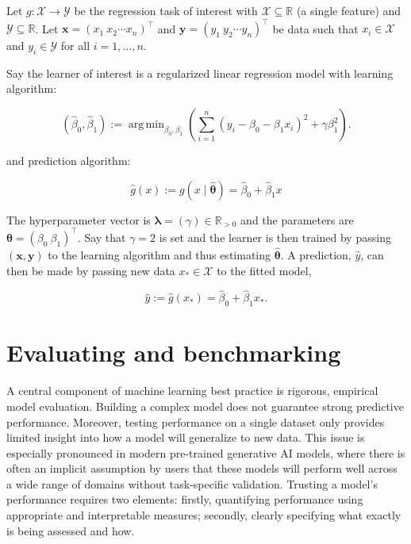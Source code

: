 \documentclass[
  letterpaper,
  krantz2]{style/krantz}
\begin{document}
\begin{tcolorbox}[enhanced jigsaw, toprule=.15mm, bottomtitle=1mm, opacityback=0, breakable, leftrule=.75mm, title={Box 1 (Ridge regression)}, toptitle=1mm, bottomrule=.15mm, colback=white, colframe=quarto-callout-note-color-frame, titlerule=0mm, opacitybacktitle=0.6, coltitle=black, rightrule=.15mm, left=2mm, colbacktitle=quarto-callout-note-color!10!white, arc=.35mm]

Let \(g : \mathcal{X}\rightarrow \mathcal{Y}\) be the
regression task of interest with
\(\mathcal{X}\subseteq \mathbb{R}\) (a single feature) and
\(\mathcal{Y}\subseteq \mathbb{R}\). Let
\(\boldsymbol{\mathbf{x}} = ({x}_1 \ {x}_2 \cdots {x}_{n})^\top\) and
\(\boldsymbol{\mathbf{y}} = ({y}_1 \ {y}_2 \cdots {y}_{n})^\top\) be
data such that \(x_i \in \mathcal{X}\) and \(y_i \in \mathcal{Y}\) for
all \(i = 1,\ldots,n\).

Say the learner of interest is a regularized linear regression
model with learning algorithm:

\[
(\hat{\beta}_0,\hat{\beta}_1):=\mathop{\mathrm{arg\,min}}_{\beta_0,\beta_1}\left(\sum_{i=1}^n\left(y_i-\beta_0 -\beta_1 x_i\right)^2+\gamma\beta_1^2\right).
\]

and prediction algorithm:

\[
\hat{g}(x):= g(x \mid \hat{\boldsymbol{\theta}}) = \hat{\beta}_0 + \hat{\beta}_1 x
\]

The hyperparameter vector is
\(\boldsymbol{\lambda}= (\gamma) \in \mathbb{R}_{>0}\) and the
parameters are \(\boldsymbol{\theta}= (\beta_0 \ \beta_1)^\top\). Say
that \(\gamma = 2\) is set and the learner is then trained by passing
\((\mathbf{x}, \mathbf{y})\) to the learning algorithm and thus
estimating \(\hat{\boldsymbol{\theta}}\). A prediction, \(\hat{y}\), can
then be made by passing new data \(x_* \in \mathcal{X}\) to the fitted
model,

\[
\hat{y}:= \hat{g}(x_*) = \hat{\beta}_0 + \hat{\beta}_1x_*.
\]

\end{tcolorbox}

\section{Evaluating and benchmarking}\label{sec-ml-eval}

A central component of machine learning best practice is rigorous,
empirical model evaluation. Building a complex
model does not guarantee strong predictive performance. Moreover,
testing performance on a single dataset only provides limited insight
into how a model will generalize to new data. This issue is especially
pronounced in modern pre-trained generative AI
models, where there is often
an implicit assumption by users that these models will perform well
across a wide range of domains without task-specific validation.
Trusting a model's performance requires two elements: firstly,
quantifying performance using appropriate and interpretable
measures; secondly, clearly specifying what
exactly is being assessed and how.
\end{document}
